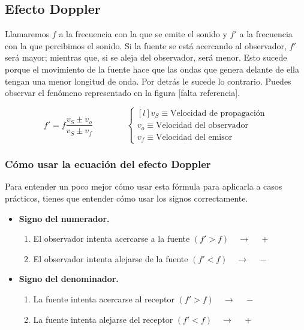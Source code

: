 \documentclass[a4paper]{book}
\numberwithin{figure}{chapter}
\numberwithin{equation}{chapter}
\begin{document}
\subsection{Efecto Doppler}
Llamaremos $f$ a la frecuencia con la que se emite el sonido y $f'$ a la frecuencia con la que percibimos el sonido. Si la fuente se está acercando al observador, $f'$ será mayor; mientras que, si se aleja del observador, será menor. Esto sucede porque el movimiento de la fuente hace que las ondas que genera delante de ella tengan una menor longitud de onda. Por detrás le sucede lo contrario. Puedes observar el fenómeno representado en la figura [falta referencia].

\[\boxed{f' = f\frac{v_S \pm v_o}{v_S \pm v_f}} \qquad \qquad \left\{ \begin{matrix*}[l]
		v_S \equiv \text{Velocidad de propagación}\\[5pt]
		v_o \equiv \text{Velocidad del observador}\\[5pt]
		v_f \equiv \text{Velocidad del emisor}
	\end{matrix*} \right. \]

\subsubsection{Cómo usar la ecuación del efecto Doppler}
Para entender un poco mejor cómo usar esta fórmula para aplicarla a casos prácticos, tienes que entender cómo usar los signos correctamente.
\begin{itemize}
	\item \textbf{Signo del numerador.}
	      \begin{enumerate}
		      \item El observador intenta acercarse a la fuente $(f'>f) \quad \longrightarrow \quad$ \textcircled{+}
		      \item El observador intenta alejarse de la fuente $(f'<f) \quad \longrightarrow \quad$ \textcircled{$-$}
	      \end{enumerate}
	\item \textbf{Signo del denominador.}
	      \begin{enumerate}
		      \item La fuente intenta acercarse al receptor $(f'>f) \quad \longrightarrow \quad$ \textcircled{$-$}
		      \item La fuente intenta alejarse del receptor $(f'<f) \quad \longrightarrow \quad$ \textcircled{+}
	      \end{enumerate}
\end{itemize}
\end{document}
